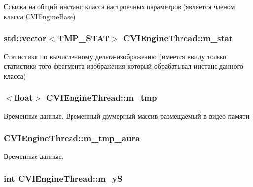 Ссылка на общий инстанс класса настроечных параметров (является членом класса \hyperlink{class_c_v_i_engine_base}{C\+V\+I\+Engine\+Base}) 

\hypertarget{class_c_v_i_engine_thread_aa356e0ebc6490ee932679fb7ca5021b5}{
\subsubsection[{m\+\_\+stat}]{\setlength{\rightskip}{0pt plus 5cm}std\+::vector$<${\bf T\+M\+P\+\_\+\+S\+T\+A\+T}$>$ C\+V\+I\+Engine\+Thread\+::m\+\_\+stat}}\label{class_c_v_i_engine_thread_aa356e0ebc6490ee932679fb7ca5021b5}


Статистики по вычисленному дельта-\/изображению (имеется ввиду только статистики того фрагмента изображения который обрабатывал инстанс данного класса) 

\hypertarget{class_c_v_i_engine_thread_af213b9d425f314412e3de05774960c3f}{
\subsubsection[{m\+\_\+tmp}]{$<$float$>$ C\+V\+I\+Engine\+Thread\+::m\+\_\+tmp}}\label{class_c_v_i_engine_thread_af213b9d425f314412e3de05774960c3f}


Временные данные. Временный двумерный массив размещаемый в видео памяти 

\hypertarget{class_c_v_i_engine_thread_a6ffad2b9d46d3d237d194b7d07720f6b}{
\subsubsection[{m\+\_\+tmp\+\_\+aura}]{ C\+V\+I\+Engine\+Thread\+::m\+\_\+tmp\+\_\+aura}}\label{class_c_v_i_engine_thread_a6ffad2b9d46d3d237d194b7d07720f6b}


Временные данные. 

\hypertarget{class_c_v_i_engine_thread_a19834ce7dacd0ff5d1cc4615c040830c}{
\subsubsection[{m\+\_\+y\+S}]{\setlength{\rightskip}{0pt plus 5cm}int C\+V\+I\+Engine\+Thread\+::m\+\_\+y\+S}}\label{class_c_v_i_engine_thread_a19834ce7dacd0ff5d1cc4615c040830c}


